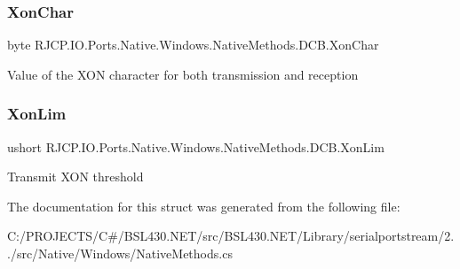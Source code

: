 \subsubsection{\texorpdfstring{XonChar}{XonChar}}
{\footnotesize\ttfamily byte R\+J\+C\+P.\+I\+O.\+Ports.\+Native.\+Windows.\+Native\+Methods.\+D\+C\+B.\+Xon\+Char}



Value of the X\+ON character for both transmission and reception 

\mbox{\label{struct_r_j_c_p_1_1_i_o_1_1_ports_1_1_native_1_1_windows_1_1_native_methods_1_1_d_c_b_a89862e94bf704380cc871e988cc93a71}} 
\subsubsection{\texorpdfstring{XonLim}{XonLim}}
{\footnotesize\ttfamily ushort R\+J\+C\+P.\+I\+O.\+Ports.\+Native.\+Windows.\+Native\+Methods.\+D\+C\+B.\+Xon\+Lim}



Transmit X\+ON threshold 



The documentation for this struct was generated from the following file\+:\begin{DoxyCompactItemize}
\item 
C\+:/\+P\+R\+O\+J\+E\+C\+T\+S/\+C\#/\+B\+S\+L430.\+N\+E\+T/src/\+B\+S\+L430.\+N\+E\+T/\+Library/serialportstream/2../src/\+Native/\+Windows/Native\+Methods.\+cs\end{DoxyCompactItemize}
